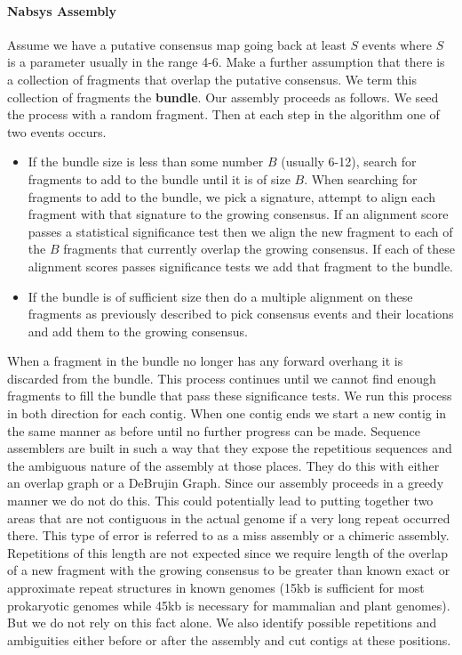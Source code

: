 \documentclass[11pt]{article}
\begin{document}
\paragraph{Nabsys Assembly\newline}
\par{Assume we have a putative consensus map going back at least $S$ events where $S$ is a parameter usually in the range 4-6.  Make a further assumption that there is a collection of fragments that overlap the putative consensus.  We term this collection of fragments the \textbf{bundle}.  Our assembly proceeds as follows. We seed the process with a random fragment. Then at each step in the algorithm one of two events occurs.
\begin{itemize}
\item  If the bundle size is less than some number $B$ (usually 6-12), search for fragments to add to the bundle until it is of size $B$. When searching for fragments to add to the bundle, we pick a signature, attempt to align each fragment with that signature to the growing consensus.  If an alignment score passes a statistical significance test then we align the new fragment to each of the $B$ fragments that currently overlap the growing consensus.  If each of these alignment scores passes significance tests we add that fragment to the bundle.
\item If the bundle is of sufficient size then do a multiple alignment on these fragments as previously described to pick consensus events and their locations and add them to the growing consensus.
\end{itemize} When a fragment in the bundle no longer has any forward overhang it is discarded from the bundle. This process continues until we cannot find enough fragments to fill the bundle that pass these significance tests. We run this process in both direction for each contig. When one contig ends we start a new contig in the same manner as before until no further progress can be made. Sequence assemblers are built in such a way that they expose the repetitious sequences and the ambiguous nature of the assembly at those places. They do this with either an overlap graph or a DeBrujin Graph. Since our assembly proceeds in a greedy manner we do not do this.  This could potentially lead to putting together two areas that are not contiguous in the actual genome if a very long repeat occurred there. This type of error is referred to as a miss assembly or a chimeric assembly.  Repetitions of this length are not expected since we require length of the overlap of a new fragment with the growing consensus to be greater than known exact or approximate repeat structures in known genomes (15kb is sufficient for most prokaryotic genomes while 45kb is necessary for mammalian and plant genomes). But we do not rely on this fact alone. We also identify possible repetitions and ambiguities either before or after the assembly and cut contigs at these positions.\cite{assemblyReview}\cite{StringGraph}\cite{ValouevAssembler}
}
\end{document}
